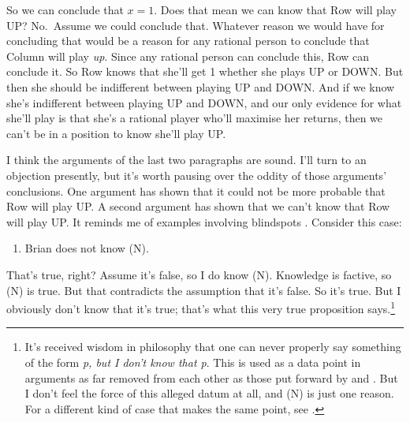 \documentclass[11pt,]{book}
\providecommand{\tightlist}{%
  \setlength{\itemsep}{0pt}\setlength{\parskip}{0pt}}
\let\rmarkdownfootnote\footnote%
\def\footnote{\protect\rmarkdownfootnote}
\begin{document}
So we can conclude that \(x = 1\). Does that mean we can know that Row will play UP? No.~Assume we could conclude that. Whatever reason we would have for concluding that would be a reason for any rational person to conclude that Column will play \emph{up}. Since any rational person can conclude this, Row can conclude it. So Row knows that she'll get 1 whether she plays UP or DOWN. But then she should be indifferent between playing UP and DOWN. And if we know she's indifferent between playing UP and DOWN, and our only evidence for what she'll play is that she's a rational player who'll maximise her returns, then we can't be in a position to know she'll play UP.

I think the arguments of the last two paragraphs are sound. I'll turn to an objection presently, but it's worth pausing over the oddity of those arguments' conclusions. One argument has shown that it could not be more probable that Row will play UP. A second argument has shown that we can't know that Row will play UP. It reminds me of examples involving blindspots
\citep{Sorensen1988}. Consider this case:

\begin{enumerate}
\def\labelenumi{(\Alph{enumi})}
\setcounter{enumi}{13}
\tightlist
\item
  Brian does not know (N).
\end{enumerate}

That's true, right? Assume it's false, so I do know (N). Knowledge is factive, so (N) is true. But that contradicts the assumption that it's false. So it's true. But I obviously don't know that it's true; that's what this very true proposition says.\footnote{It's received wisdom in philosophy that one can never properly say something of the form \emph{p, but I don't know that p}. This is used as a data point in arguments as far removed from each other as those put forward by \citet{Heal1994} and \citet{Williamson1996-WILKAA}. But I don't feel the force of this alleged datum at all, and (N) is just one reason. For a different kind of case that makes the same point, see \citet{MaitraWeatherson}.}
\end{document}
